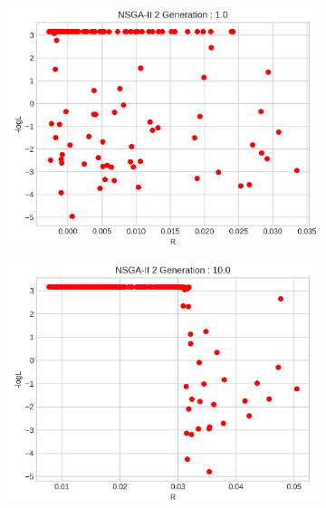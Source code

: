\begin{figure}[H]
  \centering
  \begin{minipage}[b]{0.22\textwidth}
  \begin{figure}[H]
      \centering
      \includegraphics[width=\textwidth]{images/1-NSGA-II 2 Generation _ 1.0-R - logL-point.png}
  \end{figure}
  \end{minipage}
  \hspace{0.0cm}
  \begin{minipage}[b]{0.22\textwidth}
  \begin{figure}[H]
      \centering
      \includegraphics[width=\textwidth]{images/1-NSGA-II 2 Generation _ 10.0-R - logL-point.png}

\end{figure}
\end{minipage}
\end{figure}
